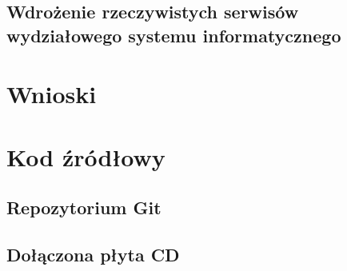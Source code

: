 \documentclass[polish, a4paper, 12pt, oneside]{book}
\begin{document}
\section{Wdrożenie rzeczywistych serwisów wydziałowego systemu informatycznego}

\chapter{Wnioski}

\chapter{Kod źródłowy}
\section{Repozytorium Git}
\section{Dołączona płyta CD}


\end{document}

